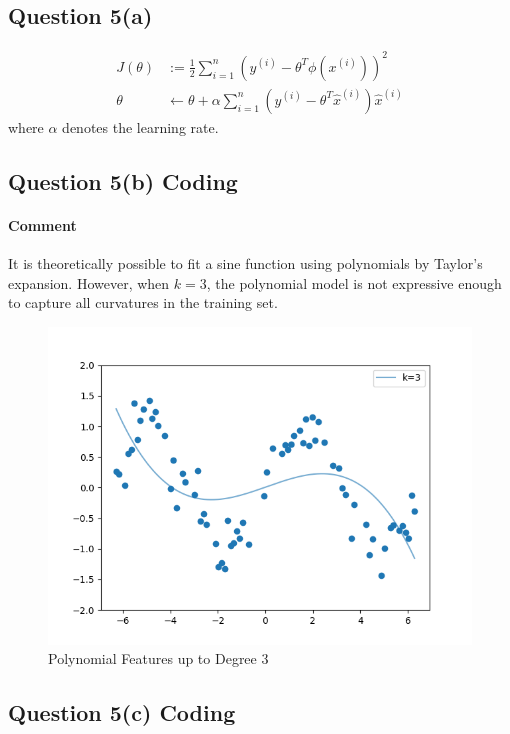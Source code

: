 \documentclass[11pt]{article}
\newcommand{\upi}[0]{^{(i)}}
\begin{document}
	\subsection{Question 5(a)}
	\begin{align}
		J(\theta) &:= \frac{1}{2} \sum_{i=1}^n \left(y\upi - \theta^T \phi(x\upi) \right)^2 \\
		\theta &\leftarrow \theta + \alpha \sum_{i=1}^n \left(y\upi - \theta^T \hat{x}\upi \right) \hat{x}\upi
	\end{align}
	where $\alpha$ denotes the learning rate.
	\subsection{Question 5(b) Coding}
	\paragraph{Comment} It is theoretically possible to fit a sine function using polynomials by Taylor's expansion. However, when $k=3$, the polynomial model is not expressive enough to capture all curvatures in the training set.
	\begin{figure}[h]
		\centering
		\includegraphics[width=0.6\linewidth]{src/featuremaps/5b.png}
		\caption{Polynomial Features up to Degree 3}
	\end{figure}
	
	\newpage
	\subsection{Question 5(c) Coding}
\end{document}
